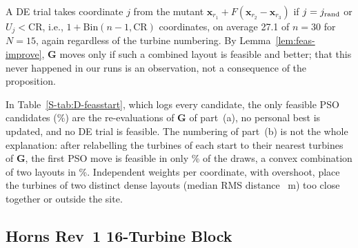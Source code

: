 A DE trial takes coordinate $j$ from the mutant $\mathbf x_{r_1}+F(\mathbf x_{r_2}-\mathbf x_{r_3})$ if $j=j_{\rm rand}$ or $U_j<\mathrm{CR}$, i.e., $1+\mathrm{Bin}(n-1,\mathrm{CR})$ coordinates, on average 27.1 of $n=30$ for $N=15$, again regardless of the turbine numbering. By Lemma~\ref{lem:feas-improve}, $\mathbf G$ moves only if such a combined layout is feasible and better; that this never happened in our runs is an observation, not a consequence of the proposition.

In Table~\ref{S-tab:D-feasstart}, which logs every candidate, the only feasible PSO candidates (\NDFsFeasCandPSO\%) are the re-evaluations of $\mathbf G$ of part~(a), no personal best is updated, and no DE trial is feasible. The numbering of part~(b) is not the whole explanation: after relabelling the turbines of each start to their nearest turbines of $\mathbf G$, the first PSO move is feasible in only \NDFsMixMatched\% of the draws, a convex combination of two layouts in \NDFsMixScalar\%. Independent weights per coordinate, with overshoot, place the turbines of two distinct dense layouts (median RMS distance \NDFsInitRms~m) too close together or outside the site.

\subsection{Horns Rev~1 16-Turbine Block}
\label{sec:hornsrev-site}


